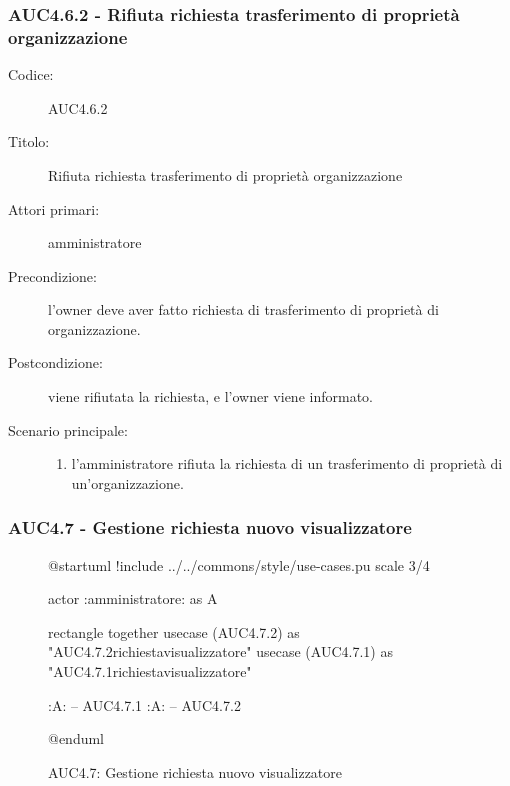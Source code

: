 \documentclass[casi-duso]{subfiles}
\begin{document}
\subsubsection{AUC4.6.2 - Rifiuta richiesta trasferimento di proprietà organizzazione}%
\label{subsub:AUC4.6.2}
\begin{description}
  \item[Codice:] AUC4.6.2
  \item[Titolo:] Rifiuta richiesta trasferimento di proprietà organizzazione
  \item[Attori primari:] amministratore
  \item[Precondizione:] l'owner deve aver fatto richiesta di trasferimento di proprietà di organizzazione.
  \item[Postcondizione:] viene rifiutata la richiesta, e l'owner viene informato.
  \item[Scenario principale:]
  \begin{enumerate}
    \item  l'amministratore rifiuta la richiesta di un trasferimento di proprietà di un'organizzazione.
  \end{enumerate}
\end{description}

\subsubsection{AUC4.7 - Gestione richiesta nuovo visualizzatore}%
\label{subsub:AUC4.7}

\begin{figure}[h!]
  \centering
  \begin{plantuml}
  @startuml
  !include ../../commons/style/use-cases.pu
  scale 3/4

  actor :amministratore: as A

  rectangle {
    together {
      usecase (AUC4.7.2) as "AUC4.7.2\nRifiuta richiesta\nnuovo visualizzatore"
      usecase (AUC4.7.1) as "AUC4.7.1\nAccetta richiesta\nnuovo visualizzatore"
    }
  }

  :A: -- AUC4.7.1
  :A: -- AUC4.7.2

  @enduml
  \end{plantuml}
  \caption{AUC4.7: Gestione richiesta nuovo visualizzatore}
  \label{fig:auc4_7}
\end{figure}
\end{document}

